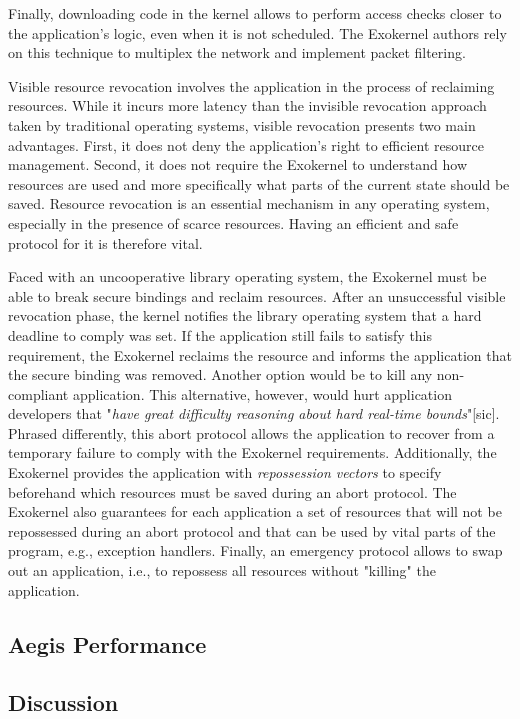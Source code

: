 Finally, downloading code in the kernel allows to perform access checks closer to the application's logic, even when it is not scheduled.
The Exokernel authors rely on this technique to multiplex the network and implement packet filtering.

Visible resource revocation involves the application in the process of reclaiming resources.
While it incurs more latency than the invisible revocation approach taken by traditional operating systems, visible revocation presents two main advantages.
First, it does not deny the application's right to efficient resource management.
Second, it does not require the Exokernel to understand how resources are used and more specifically what parts of the current state should be saved.
Resource revocation is an essential mechanism in any operating system, especially in the presence of scarce resources.
Having an efficient and safe protocol for it is therefore vital.

Faced with an uncooperative library operating system, the Exokernel must be able to break secure bindings and reclaim resources.
After an unsuccessful visible revocation phase, the kernel notifies the library operating system that a hard deadline to comply was set.
If the application still fails to satisfy this requirement, the Exokernel reclaims the resource and informs the application that the secure binding was removed.
Another option would be to kill any non-compliant application.
This alternative, however, would hurt application developers that "\textit{have great difficulty reasoning about hard real-time bounds}"[sic].
Phrased differently, this abort protocol allows the application to recover from a temporary failure to comply with the Exokernel requirements.
Additionally, the Exokernel provides the application with \emph{repossession vectors} to specify beforehand which resources must be saved during an abort protocol.
The Exokernel also guarantees for each application a set of resources that will not be repossessed during an abort protocol and that can be used by vital parts of the program, e.g., exception handlers.
Finally, an emergency protocol allows to swap out an application, i.e., to repossess all resources without "killing" the application.

\subsection{Aegis Performance}



\subsection{Discussion}




